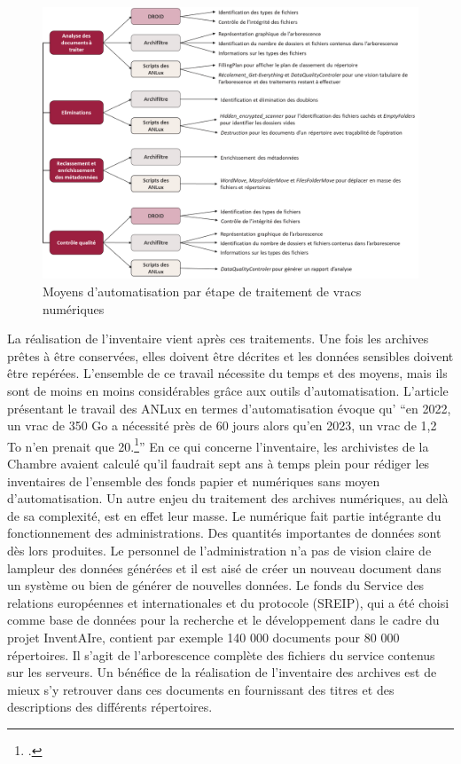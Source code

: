 \begin{figure}[h!]
	\centerline{\includegraphics[width=\textwidth]{./media/image2.png}}
	\caption[note]{Moyens d'automatisation par étape de traitement de vracs numériques \footnotemark }
\end{figure}


La réalisation de l'inventaire vient après ces traitements. Une fois les
archives prêtes à être conservées, elles doivent être décrites et les
données sensibles doivent être repérées. L'ensemble de ce travail
nécessite du temps et des moyens, mais ils sont de moins en moins considérables grâce aux outils d'automatisation. 
L'article présentant le travail des ANLux en termes d'automatisation évoque qu'
 \enquote{en 2022, un vrac de 350 Go a nécessité près de 60 jours alors qu'en 2023, un vrac de 1,2 To n'en prenait que 20.\footcite{IA_porte}} 
En ce qui concerne l'inventaire, les
archivistes de la Chambre avaient calculé qu'il faudrait sept ans à
temps plein pour rédiger les inventaires de l'ensemble des fonds papier et numériques sans moyen d'automatisation. 
Un autre enjeu du traitement des archives numériques, au delà de sa complexité, est en effet leur masse. 
Le numérique fait partie intégrante du fonctionnement des administrations. Des quantités
importantes de données sont dès lors produites. Le personnel de
l'administration n'a pas de vision claire de l\textquotesingle ampleur
des données générées et il est aisé de créer un nouveau document dans un
système ou bien de générer de nouvelles données. Le fonds du Service des
relations européennes et internationales et du protocole (SREIP), qui a
été choisi comme base de données pour la recherche et le développement
dans le cadre du projet InventAIre, contient par exemple 140 000
documents pour 80 000 répertoires. Il s'agit de l'arborescence complète
des fichiers du service contenus sur les serveurs. Un bénéfice de la
réalisation de l'inventaire des archives est de mieux s'y retrouver dans
ces documents en fournissant des titres et des descriptions des
différents répertoires.


